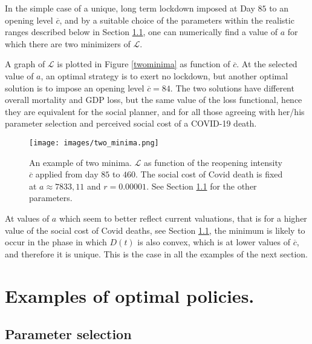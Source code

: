\documentclass{amsart}
\begin{document}
 In the simple case of a unique, long term lockdown
 imposed at Day $85$ to an opening level $\overline c$, and by a suitable choice of the parameters within
 the realistic ranges described below 
  in Section \ref{calibration}, one
  can numerically find a value of $a$ for which there are
  two minimizers of $\mathcal{L}$. 
  
 A graph of $\mathcal{L}$ is plotted in Figure \ref{twominima} 
  as function of $\overline c$. 
  At the selected value of $a$, an optimal strategy is to exert no lockdown, 
  but another optimal solution is to impose
  an opening level $\overline c=84$. The two solutions have
  different overall mortality and GDP loss, but the same
  value of the loss functional, hence they are
  equivalent for the social planner, and for all
  those agreeing with her/his parameter selection and
  perceived social cost of a COVID-19 death.


 
 \vspace{0.4cm}
\begin{figure}[h!] \label{twominima}
    \centering
    \texttt{[image: images/two\_minima.png]}
    \caption{An example of two minima. 
    $\mathcal{L}$ as function of the reopening
    intensity $\overline c$ applied from day $85$ to $460$.
    The social cost of Covid death is fixed at $a\approx 7833,11$ and $r=0.00001$. See Section \ref{calibration} for the other parameters. }
    \label{two-min}
\end{figure}


\vspace{0.4cm}

At  values of $a$ which seem to better reflect current valuations, that is for a higher value of the social cost
of Covid deaths,
see Section \ref{calibration}, the minimum is likely to occur in the
phase in which $D(t)$ is also convex, which is at lower values of
$\overline c$, and therefore it
is unique. This is the case in all the examples of
the next section.



 



\section{Examples of optimal policies.} \label{Examples}
 \subsection{Parameter selection}\label{calibration}
 
\end{document}
